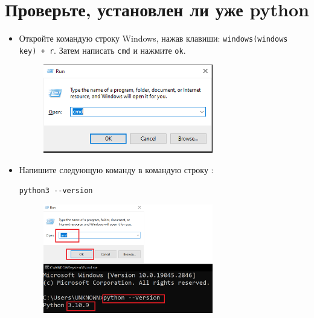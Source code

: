 \documentclass[12pt]{article}
\begin{document}
\setcounter{page}{1}%

\section{Проверьте, установлен ли уже python}\label{sec:check}
\begin{itemize}
	\item  {Откройте командую строку Windows, нажав клавиши: \texttt{windows(windows key) + r}. Затем написать \texttt{cmd} и нажмите \texttt{ok}.

	      \begin{figure}[H]
		      \centering
		      \includegraphics[width =0.7\textwidth ,keepaspectratio]{imgs/open_console.png}
		      \caption{}
	      \end{figure}
	      }

	\item  {Напишите следующую команду в командую строку :

	      \begin{lstlisting}[caption=\phantom{},style=conlst,label={check_version}]
python3 --version
\end{lstlisting}

	      \begin{figure}[H]
		      \centering
		      \includegraphics[width =0.7\textwidth ,keepaspectratio]{imgs/check_python.png}
		      \caption{}
	      \end{figure}

	      }
\end{itemize}
\end{document}
